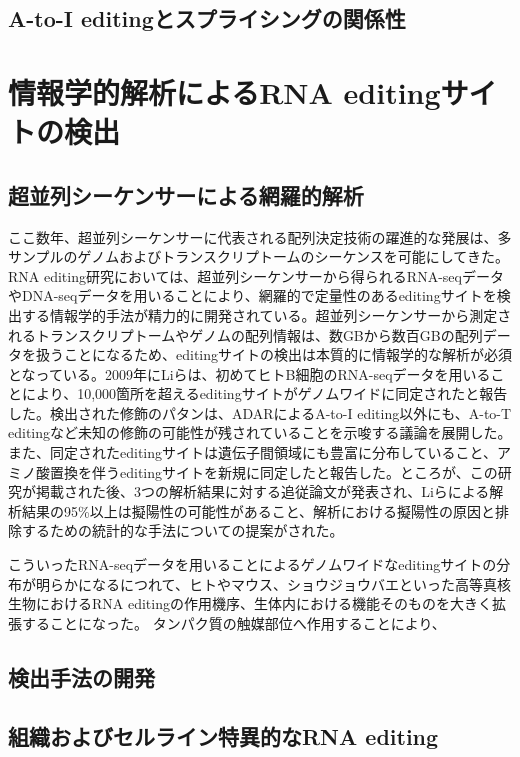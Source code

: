 \subsection{A-to-I editingとスプライシングの関係性}

\section{情報学的解析によるRNA editingサイトの検出}
\subsection{超並列シーケンサーによる網羅的解析}
ここ数年、超並列シーケンサーに代表される配列決定技術の躍進的な発展は、多サンプルのゲノムおよびトランスクリプトームのシーケンスを可能にしてきた。RNA editing研究においては、超並列シーケンサーから得られるRNA-seqデータやDNA-seqデータを用いることにより、網羅的で定量性のあるeditingサイトを検出する情報学的手法が精力的に開発されている。超並列シーケンサーから測定されるトランスクリプトームやゲノムの配列情報は、数GBから数百GBの配列データを扱うことになるため、editingサイトの検出は本質的に情報学的な解析が必須となっている。2009年にLiらは、初めてヒトB細胞のRNA-seqデータを用いることにより、10,000箇所を超えるeditingサイトがゲノムワイドに同定されたと報告した。検出された修飾のパタンは、ADARによるA-to-I editing以外にも、A-to-T editingなど未知の修飾の可能性が残されていることを示唆する議論を展開した。また、同定されたeditingサイトは遺伝子間領域にも豊富に分布していること、アミノ酸置換を伴うeditingサイトを新規に同定したと報告した。ところが、この研究が掲載された後、3つの解析結果に対する追従論文が発表され、Liらによる解析結果の95\%以上は擬陽性の可能性があること、解析における擬陽性の原因と排除するための統計的な手法についての提案がされた。

こういったRNA-seqデータを用いることによるゲノムワイドなeditingサイトの分布が明らかになるにつれて、ヒトやマウス、ショウジョウバエといった高等真核生物におけるRNA editingの作用機序、生体内における機能そのものを大きく拡張することになった。
タンパク質の触媒部位へ作用することにより、

\subsection{検出手法の開発}
\subsection{組織およびセルライン特異的なRNA editing}

